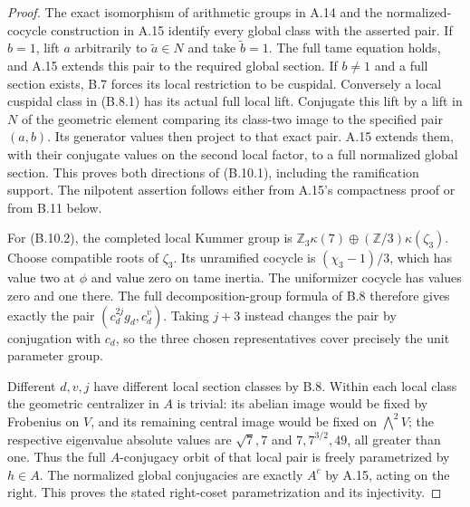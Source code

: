 \begin{proof}
The exact isomorphism of arithmetic groups in A.14 and
the normalized-cocycle construction in A.15 identify
every global class with the asserted pair.
If $b=1$, lift $a$ arbitrarily to $\widetilde a\in N$
and take $\widetilde b=1$.  The full tame equation holds,
and A.15 extends this pair to the required global section.
If $b\ne1$ and a full section exists, B.7 forces its
local restriction to be cuspidal.  Conversely a local
cuspidal class in (B.8.1) has its actual full local lift.
Conjugate this lift by a lift in $N$ of the geometric
element comparing its class-two image to the specified
pair $(a,b)$.  Its generator values then project to
that exact pair.  A.15 extends them, with their conjugate
values on the second local factor, to a full normalized
global section.  This proves both directions of
(B.10.1), including the ramification support.
The nilpotent assertion follows either from A.15's
compactness proof or from B.11 below.

For (B.10.2), the completed local Kummer group is
$\mathbb Z_3\kappa(7)\oplus(\mathbb Z/3)\kappa(\zeta_3)$.
Choose compatible roots of $\zeta_3$.  Its unramified
cocycle is $(\chi_3-1)/3$, which has value two at
$\phi$ and value zero on tame inertia.
The uniformizer cocycle has values zero and one there.
The full decomposition-group formula of B.8 therefore
gives exactly the pair $(c_d^{2j}g_d,c_d^v)$.
Taking $j+3$ instead changes the pair by conjugation
with $c_d$, so the three chosen representatives cover
precisely the unit parameter group.

Different $d,v,j$ have different local section classes
by B.8.  Within each local class the geometric
centralizer in $A$ is trivial: its abelian image would
be fixed by Frobenius on $V$, and its remaining central
image would be fixed on $\bigwedge^2V$; the respective
eigenvalue absolute values are $\sqrt7,7$ and
$7,7^{3/2},49$, all greater than one.
Thus the full $A$-conjugacy orbit of that local pair
is freely parametrized by $h\in A$.
The normalized global conjugacies are exactly $A^c$
by A.15, acting on the right.  This proves the stated
right-coset parametrization and its injectivity.
\end{proof}

